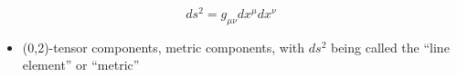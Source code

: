 \begin{itemize}
\begin{itemize}
        $$ds^2=g_{\mu\nu}dx^{\mu}dx^{\nu}$$

        \begin{itemize}

          \item (0,2)-tensor components, metric components, with $ds^2$ being called the ``line element'' or ``metric''

        \end{itemize}

    \end{itemize}

\end{itemize}



